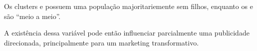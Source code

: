 Os clusters \emph{\nomeCb{}} e \emph{\nomeCc{}} possuem uma população majoritariemente
sem filhos, enquanto os \emph{\nomeCa{}} e \emph{\nomeCd{}} são ``meio a meio''. 

A existência dessa variável pode então influenciar parcialmente uma
publicidade direcionada, principalmente para um marketing transformativo.








